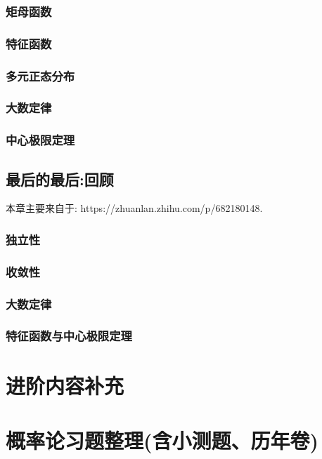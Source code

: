\documentclass[lang=cn,10pt]{elegantbook}
\begin{document}
\section{矩母函数}

\section{特征函数}

\section{多元正态分布}

\section{大数定律}

\section{中心极限定理}

\chapter{最后的最后:回顾}
本章主要来自于: https://zhuanlan.zhihu.com/p/682180148.
\section{独立性}

\section{收敛性}

\section{大数定律}

\section{特征函数与中心极限定理}

\part{进阶内容补充}

\part{概率论习题整理(含小测题、历年卷)}
\end{document}

